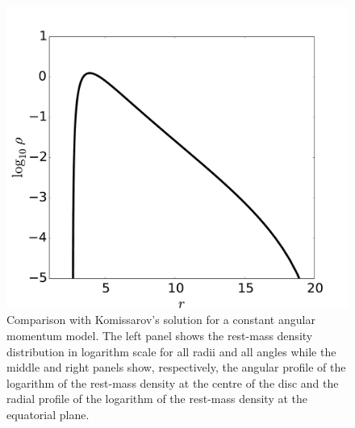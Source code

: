 \documentclass{aa}
\begin{document}
\begin{figure}[t]
\includegraphics[scale=0.14]{figures/fig1c.pdf}
\caption{Comparison with Komissarov's solution for a constant angular momentum model. The left panel shows the rest-mass density distribution in logarithm scale for all radii and all angles while the middle and right panels show, respectively, the angular profile of the logarithm of the rest-mass density at the centre of the disc and the radial profile of the logarithm of the rest-mass density at the equatorial plane.}
\label{komissarov}
\end{figure}
\end{document}
